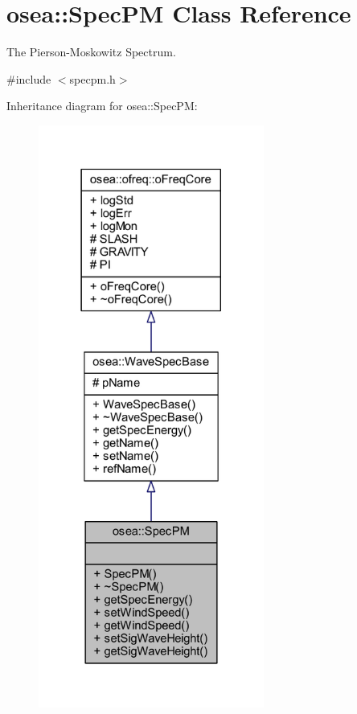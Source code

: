 \hypertarget{classosea_1_1_spec_p_m}{\section{osea\-:\-:Spec\-P\-M Class Reference}
\label{classosea_1_1_spec_p_m}
}


The Pierson-\/\-Moskowitz Spectrum.  




{\ttfamily \#include $<$specpm.\-h$>$}



Inheritance diagram for osea\-:\-:Spec\-P\-M\-:
\nopagebreak
\begin{figure}[H]
\begin{center}
\leavevmode
\includegraphics[width=210pt]{classosea_1_1_spec_p_m__inherit__graph}
\end{center}
\end{figure}
